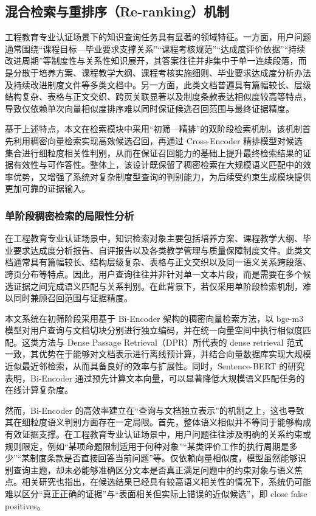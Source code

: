 \documentclass[UTF8,a4paper,zihao=-4]{ctexart}
\begin{document}
\subsection{混合检索与重排序（Re-ranking）机制}


工程教育专业认证场景下的知识查询任务具有显著的领域特征。一方面，用户问题通常围绕“课程目标—毕业要求支撑关系”“课程考核规范”“达成度评价依据”“持续改进周期”等制度性与关系性知识展开，其答案往往并非集中于单一连续段落，而是分散于培养方案、课程教学大纲、课程考核实施细则、毕业要求达成度分析办法及持续改进制度文件等多类文档中。另一方面，此类文档普遍具有篇幅较长、层级结构复杂、表格与正文交织、跨页关联显著以及制度条款表达相似度较高等特点，导致仅依赖单次向量相似度排序难以同时保证候选召回范围与最终证据精度。

基于上述特点，本文在检索模块中采用“初筛—精排”的双阶段检索机制。该机制首先利用稠密向量检索实现高效候选召回，再通过 Cross-Encoder 精排模型对候选集合进行细粒度相关性判别，从而在保证召回能力的基础上提升最终检索结果的证据有效性与可作答性。整体上，该设计既保留了稠密检索在大规模语义匹配中的效率优势，又增强了系统对复杂制度型查询的判别能力，为后续受约束生成模块提供更加可靠的证据输入。

\subsubsection{单阶段稠密检索的局限性分析}

在工程教育专业认证场景中，知识检索对象主要包括培养方案、课程教学大纲、毕业要求达成度分析报告、自评报告以及各类教学管理与质量保障制度文件。此类文档通常具有篇幅较长、结构层级复杂、表格与正文交织以及同一语义关系跨段落、跨页分布等特点。因此，用户查询往往并非针对单一文本片段，而是需要在多个候选证据之间完成语义匹配与关系判别。在此背景下，若仅采用单阶段检索机制，难以同时兼顾召回范围与证据精度。

本文系统在初筛阶段采用基于 Bi-Encoder 架构的稠密向量检索方法，以 bge-m3 模型对用户查询与文档切块分别进行独立编码，并在统一向量空间中执行相似度匹配。这类方法与 Dense Passage Retrieval（DPR）所代表的 dense retrieval 范式一致，其优势在于能够对文档表示进行离线预计算，并结合向量数据库实现大规模近似最近邻检索，从而具备良好的效率与扩展性\cite{karpukhin-etal-2020-dense}。同时，Sentence-BERT 的研究表明，Bi-Encoder 通过预先计算文本向量，可以显著降低大规模语义匹配任务的在线计算复杂度\cite{reimers-gurevych-2019-sentence}。

然而，Bi-Encoder 的高效率建立在“查询与文档独立表示”的机制之上，这也导致其在细粒度语义判别方面存在一定局限。首先，整体语义相似并不等同于能够构成有效证据支撑。在工程教育专业认证场景中，用户问题往往涉及明确的关系约束或规则限定，例如“某项命题限制适用于何种对象”“某类评价工作的执行周期是多少”“某制度条款是否直接回答当前问题”等。仅依赖向量相似度，模型虽然能够识别查询主题，却未必能够准确区分文本是否真正满足问题中的约束对象与语义焦点。相关研究也指出，在候选结果已经具有较高语义相关性的情况下，系统仍可能难以区分“真正正确的证据”与“表面相关但实际上错误的近似候选”，即 close false positives\cite{iyer-etal-2021-reconsider}。
\end{document}
